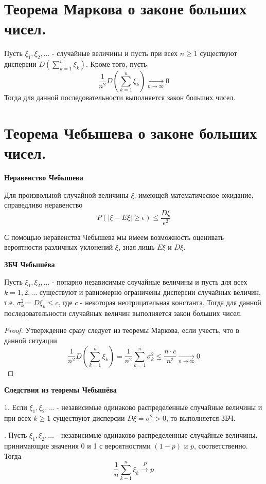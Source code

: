 \section{Теорема Маркова о законе больших чисел.}

Пусть $\xi_1, \xi_2, \dots$ - случайные величины и пусть при всех $n \ge 1$ существуют дисперсии $D \left( \sum\limits_{k=1}^{n} \xi_k \right)$. Кроме того, пусть
\[ \frac{1}{n^2} D \left( \sum\limits_{k=1}^{n} \xi_k \right) \underset{n \to \infty}{\to} 0 \]
Тогда для данной последовательности выполняется закон больших чисел.

\section{Теорема Чебышева о законе больших чисел.}

\noindent \textbf{Неравенство Чебышева}

Для произвольной случайной величины $\xi$, имеющей математическое ожидание, справедливо неравенство
\[ P( |\xi - E\xi| \ge \epsilon ) \le \frac{D\xi}{\epsilon^2} \]

\begin{remark}
	С помощью неравенства Чебышева мы имеем возможность оценивать вероятности различных уклонений $\xi$, зная лишь $E\xi$ и $D\xi$.
\end{remark}

\noindent \textbf{ЗБЧ Чебышёва}

Пусть $\xi_1, \xi_2, \dots$ - попарно независимые случайные величины и пусть для всех $k = 1, 2, \dots$ существуют и равномерно ограничены дисперсии случайных величин, т.е. $\sigma_k^2 = D\xi_k \le c$, где $c$ - некоторая неотрицательная константа. Тогда для данной последовательности случайных величин выполняется закон больших чисел.
\begin{proof}
	Утверждение сразу следует из теоремы Маркова, если учесть, что в данной ситуации
	\[ \frac{1}{n^2} D \left( \sum_{k=1}^{n} \xi_k \right) = \frac{1}{n^2} \sum_{k=1}^{n} \sigma_k^2 \le \frac{n \cdot c}{n^2} \underset{n \to \infty}{\to} 0 \]
\end{proof}

\noindent \textbf{Следствия из теоремы Чебышёва}
	
1. Если $\xi_1, \xi_2, \dots$ - независимые одинаково распределенные случайные величины и при всех $k \ge 1$ существуют дисперсии $D\xi = \sigma^2 > 0$, то выполняется ЗБЧ.

. Пусть $\xi_1, \xi_2, \dots$ - независимые одинаково распределенные случайные величины, принимающие значения 0 и 1 с вероятностями $(1-p)$ и $p$, соответственно. Тогда
\[ \frac{1}{n} \sum_{k-1}^{n} \xi_k \overset{P}{\to} p \]

